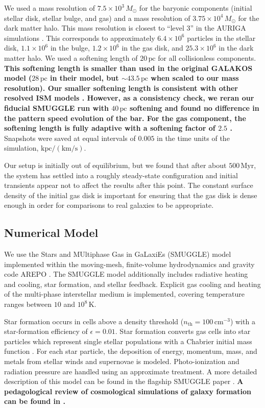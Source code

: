 \documentclass[twocolumn,linenumbers,trackchanges]{aastex631}
\newcommand{\AREPO}{\textsc{AREPO}}
\newcommand{\SMUGGLE}{SMUGGLE}
\begin{document}
We used a mass resolution of $7.5\times10^3\,M_{\odot}$ for the baryonic
components (initial stellar disk, stellar bulge, and gas) and a mass resolution
of $3.75\times10^4\,M_{\odot}$ for the dark matter halo. This mass resolution is
closest to ``level 3'' in the AURIGA simulations \citep{2017MNRAS.467..179G}.
This corresponds to approximately $6.4\times10^6$ particles in the stellar disk,
$1.1\times10^6$ in the bulge, $1.2\times10^6$ in the gas disk, and
$25.3\times10^6$ in the dark matter halo. We used a softening length of
$20\,\textrm{pc}$ for all collisionless components. {\bf This softening length
is smaller than used in the original GALAKOS model ($28\,\textrm{pc}$ in their
model, but $\sim43.5\,\textrm{pc}$ when scaled to our mass resolution). Our
smaller softening length is consistent with other resolved ISM models
\citep{2018MNRAS.480..800H, 2019MNRAS.489.4233M}. However, as a consistency
check, we reran our fiducial SMUGGLE run with $40\,\textrm{pc}$ softening and
found no difference in the pattern speed evolution of the bar. For the gas
component, the softening length is fully adaptive with a softening factor of
$2.5$ \citep[e.g.,][]{2020ApJS..248...32W}.} Snapshots were saved at equal
intervals of $0.005$ in the time units of the simulation,
$\textrm{kpc}/(\textrm{km}/\textrm{s})$.

Our setup is initially out of equilibrium, but we found that after about
$500\,\textrm{Myr}$, the system has settled into a roughly steady-state
configuration and initial transients appear not to affect the results after this
point. The constant surface density of the initial gas disk is important for
ensuring that the gas disk is dense enough in order for comparisons to real
galaxies to be appropriate.

\subsection{Numerical Model}
We use the Stars and MUltiphase Gas in GaLaxiEs (\SMUGGLE{}) model
\citep{2019MNRAS.489.4233M} implemented within the moving-mesh, finite-volume
hydrodynamics and gravity code \AREPO{} \citep{2010MNRAS.401..791S}. The \SMUGGLE{}
model additionally includes radiative heating and cooling, star formation, and
stellar feedback. Explicit gas cooling and heating of the multi-phase
interstellar medium is implemented, covering temperature ranges between $10$ and
$10^8\,\textrm{K}$.

Star formation occurs in cells above a density threshold
($n_{\textrm{th}}=100\,\textrm{cm}^{-3}$) with a star-formation efficiency of
$\epsilon = 0.01$. Star formation converts gas cells into star particles which
represent single stellar populations with a Chabrier initial mass function
\citep{2003PASP..115..763C}. For each star particle, the deposition of energy,
momentum, mass, and metals from stellar winds and supernovae is modeled.
Photo-ionization and radiation pressure are handled using an approximate
treatment. A more detailed description of this model can be found in the
flagship \SMUGGLE{} paper \citep{2019MNRAS.489.4233M}. {\bf A pedagological
review of cosmological simulations of galaxy formation can be found in
\citet{2020NatRP...2...42V}. }
\end{document}
